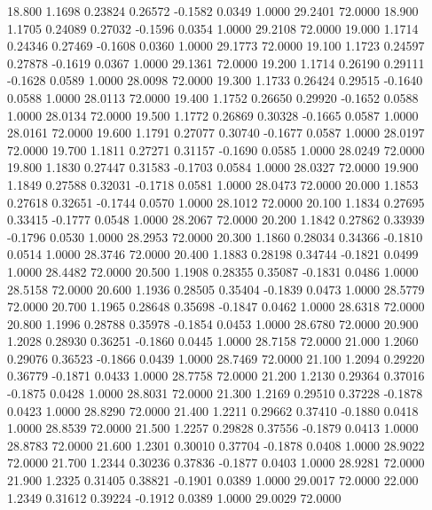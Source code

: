   18.800   1.1698   0.23824   0.26572  -0.1582   0.0349   1.0000  29.2401  72.0000
  18.900   1.1705   0.24089   0.27032  -0.1596   0.0354   1.0000  29.2108  72.0000
  19.000   1.1714   0.24346   0.27469  -0.1608   0.0360   1.0000  29.1773  72.0000
  19.100   1.1723   0.24597   0.27878  -0.1619   0.0367   1.0000  29.1361  72.0000
  19.200   1.1714   0.26190   0.29111  -0.1628   0.0589   1.0000  28.0098  72.0000
  19.300   1.1733   0.26424   0.29515  -0.1640   0.0588   1.0000  28.0113  72.0000
  19.400   1.1752   0.26650   0.29920  -0.1652   0.0588   1.0000  28.0134  72.0000
  19.500   1.1772   0.26869   0.30328  -0.1665   0.0587   1.0000  28.0161  72.0000
  19.600   1.1791   0.27077   0.30740  -0.1677   0.0587   1.0000  28.0197  72.0000
  19.700   1.1811   0.27271   0.31157  -0.1690   0.0585   1.0000  28.0249  72.0000
  19.800   1.1830   0.27447   0.31583  -0.1703   0.0584   1.0000  28.0327  72.0000
  19.900   1.1849   0.27588   0.32031  -0.1718   0.0581   1.0000  28.0473  72.0000
  20.000   1.1853   0.27618   0.32651  -0.1744   0.0570   1.0000  28.1012  72.0000
  20.100   1.1834   0.27695   0.33415  -0.1777   0.0548   1.0000  28.2067  72.0000
  20.200   1.1842   0.27862   0.33939  -0.1796   0.0530   1.0000  28.2953  72.0000
  20.300   1.1860   0.28034   0.34366  -0.1810   0.0514   1.0000  28.3746  72.0000
  20.400   1.1883   0.28198   0.34744  -0.1821   0.0499   1.0000  28.4482  72.0000
  20.500   1.1908   0.28355   0.35087  -0.1831   0.0486   1.0000  28.5158  72.0000
  20.600   1.1936   0.28505   0.35404  -0.1839   0.0473   1.0000  28.5779  72.0000
  20.700   1.1965   0.28648   0.35698  -0.1847   0.0462   1.0000  28.6318  72.0000
  20.800   1.1996   0.28788   0.35978  -0.1854   0.0453   1.0000  28.6780  72.0000
  20.900   1.2028   0.28930   0.36251  -0.1860   0.0445   1.0000  28.7158  72.0000
  21.000   1.2060   0.29076   0.36523  -0.1866   0.0439   1.0000  28.7469  72.0000
  21.100   1.2094   0.29220   0.36779  -0.1871   0.0433   1.0000  28.7758  72.0000
  21.200   1.2130   0.29364   0.37016  -0.1875   0.0428   1.0000  28.8031  72.0000
  21.300   1.2169   0.29510   0.37228  -0.1878   0.0423   1.0000  28.8290  72.0000
  21.400   1.2211   0.29662   0.37410  -0.1880   0.0418   1.0000  28.8539  72.0000
  21.500   1.2257   0.29828   0.37556  -0.1879   0.0413   1.0000  28.8783  72.0000
  21.600   1.2301   0.30010   0.37704  -0.1878   0.0408   1.0000  28.9022  72.0000
  21.700   1.2344   0.30236   0.37836  -0.1877   0.0403   1.0000  28.9281  72.0000
  21.900   1.2325   0.31405   0.38821  -0.1901   0.0389   1.0000  29.0017  72.0000
  22.000   1.2349   0.31612   0.39224  -0.1912   0.0389   1.0000  29.0029  72.0000
